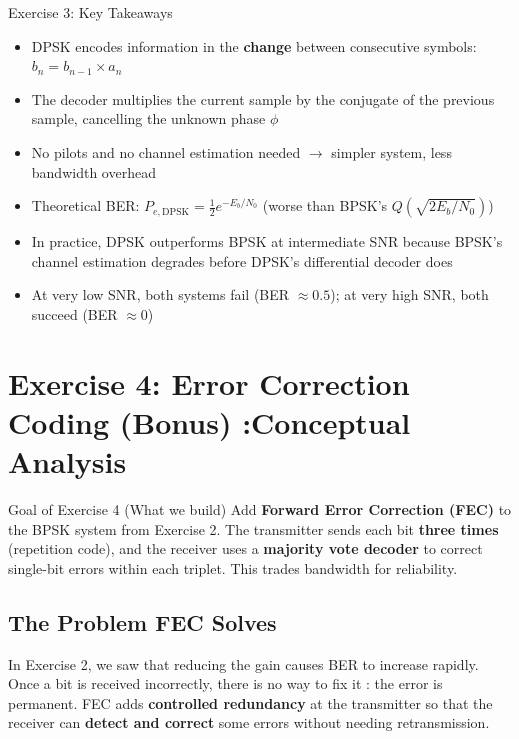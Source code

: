 \begin{SummaryBox}{Exercise 3: Key Takeaways}
\begin{itemize}
\item DPSK encodes information in the \textbf{change} between consecutive symbols: $b_n = b_{n-1} \times a_n$
\item The decoder multiplies the current sample by the conjugate of the previous sample, cancelling the unknown phase $\phi$
\item No pilots and no channel estimation needed $\rightarrow$ simpler system, less bandwidth overhead
\item Theoretical BER: $P_{e,\text{DPSK}} = \frac{1}{2}e^{-E_b/N_0}$ (worse than BPSK's $Q(\sqrt{2E_b/N_0})$)
\item In practice, DPSK outperforms BPSK at intermediate SNR because BPSK's channel estimation degrades before DPSK's differential decoder does
\item At very low SNR, both systems fail (BER $\approx 0.5$); at very high SNR, both succeed (BER $\approx 0$)
\end{itemize}
\end{SummaryBox}

\newpage
\section{Exercise 4: Error Correction Coding (Bonus) :Conceptual Analysis}
\label{sec:ex4-analysis}

\begin{GoalBox}{Goal of Exercise 4 (What we build)}
Add \textbf{Forward Error Correction (FEC)} to the BPSK system from Exercise 2. The transmitter sends each bit \textbf{three times} (repetition code), and the receiver uses a \textbf{majority vote decoder} to correct single-bit errors within each triplet. This trades bandwidth for reliability.
\end{GoalBox}

\subsection{The Problem FEC Solves}

In Exercise 2, we saw that reducing the gain causes BER to increase rapidly. Once a bit is received incorrectly, there is no way to fix it : the error is permanent. FEC adds \textbf{controlled redundancy} at the transmitter so that the receiver can \textbf{detect and correct} some errors without needing retransmission.

